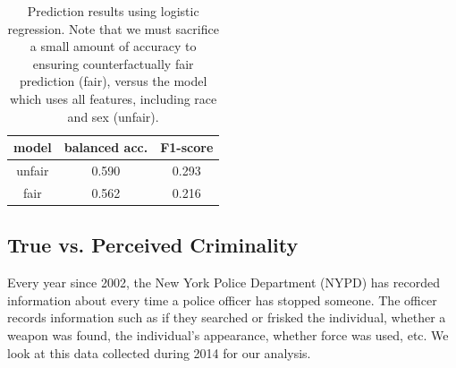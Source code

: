 \begin{table}[t]
\vspace{-2ex}
\caption{Prediction results using logistic regression. Note that we must sacrifice a small amount of accuracy to ensuring counterfactually fair prediction (fair), versus the model which uses all features, including race and sex (unfair).}
\vspace{-3ex}
\label{table.pred_law}
\begin{center}
\resizebox{\columnwidth}{!}
{
\begin{sc}
\footnotesize
\begin{tabular}{c|c|c}
\hline
\hline
model & balanced acc. & F1-score  \\
\hline
unfair & 0.590 & 0.293 \\ \hline
fair  &  0.562 & 0.216 \\
\hline
\end{tabular}
\end{sc}
}
\end{center}
\vspace{-4ex}
\end{table}


\subsection{True vs. Perceived Criminality}
Every year since 2002, the New York Police Department (NYPD) has recorded information about every time a police officer has stopped someone. The officer records information such as if they searched or frisked the individual, whether a weapon was found, the individual's appearance, whether force was used, etc. We look at this data collected during 2014 for our analysis.


